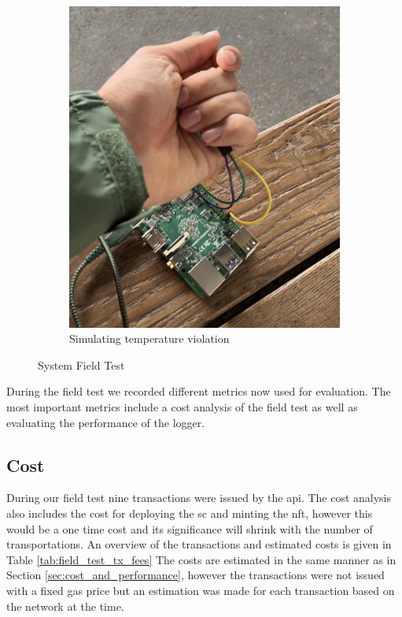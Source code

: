 \begin{figure}[ht]
\begin{subfigure}{0.5\textwidth}
        \includegraphics[height=0.25\textheight]{resources/cover_sensor.jpeg}
        \caption{Simulating temperature violation}
        \label{fig:covering_sensor}
    \end{subfigure}
    \caption{System Field Test}
    \label{fig:field_test}
\end{figure}

During the field test we recorded different metrics now used for evaluation. The most important metrics include a cost analysis of the field test as well as evaluating the performance of the logger.

\subsection{Cost}
During our field test nine transactions were issued by the \gls{api}. The cost analysis also includes the cost for deploying the \gls{sc} and minting the \gls{nft}, however this would be a one time cost and its significance will shrink with the number of transportations. An overview of the transactions and estimated costs is given in Table \ref{tab:field_test_tx_fees} The costs are estimated in the same manner as in Section \ref{sec:cost_and_performance}, however the transactions were not issued with a fixed gas price but an estimation was made for each transaction based on the network at the time. 

